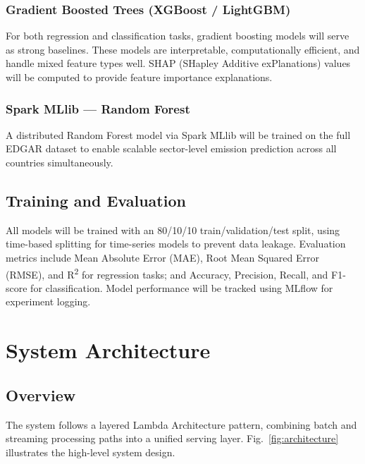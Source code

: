 \documentclass[conference]{IEEEtran}
\begin{document}
\subsubsection{Gradient Boosted Trees (XGBoost / LightGBM)}
For both regression and classification tasks, gradient boosting models will serve as strong baselines. These models are interpretable, computationally efficient, and handle mixed feature types well. SHAP (SHapley Additive exPlanations) values will be computed to provide feature importance explanations.

\subsubsection{Spark MLlib — Random Forest}
A distributed Random Forest model via Spark MLlib will be trained on the full EDGAR dataset to enable scalable sector-level emission prediction across all countries simultaneously.

\subsection{Training and Evaluation}
All models will be trained with an 80/10/10 train/validation/test split, using time-based splitting for time-series models to prevent data leakage. Evaluation metrics include Mean Absolute Error (MAE), Root Mean Squared Error (RMSE), and R\textsuperscript{2} for regression tasks; and Accuracy, Precision, Recall, and F1-score for classification. Model performance will be tracked using MLflow for experiment logging.

\section{System Architecture}

\subsection{Overview}
The system follows a layered Lambda Architecture pattern, combining batch and streaming processing paths into a unified serving layer. Fig.~\ref{fig:architecture} illustrates the high-level system design.
\end{document}
